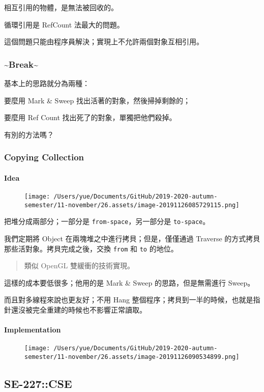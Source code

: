 \documentclass[
]{article}
\begin{document}
相互引用的物體，是無法被回收的。

循環引用是 RefCount 法最大的問題。

這個問題只能由程序員解決；實現上不允許兩個對象互相引用。

\hypertarget{header-n51}{%
\subsubsection{\texorpdfstring{\textasciitilde{}Break\textasciitilde{}}{\textasciitilde Break\textasciitilde{}}}\label{header-n51}}

基本上的思路就分為兩種：

要麼用 Mark \& Sweep 找出活著的對象，然後掃掉剩餘的；

要麼用 Ref Count 找出死了的對象，單獨把他們殺掉。

有別的方法嗎？

\hypertarget{header-n56}{%
\subsubsection{Copying Collection}\label{header-n56}}

\hypertarget{header-n57}{%
\paragraph{Idea}\label{header-n57}}

\begin{figure}
\centering
\texttt{[image: /Users/yue/Documents/GitHub/2019-2020-autumn-semester/11-november/26.assets/image-20191126085729115.png]}
\caption{}
\end{figure}

把堆分成兩部分；一部分是 \texttt{from-space}，另一部分是
\texttt{to-space}。

我們定期將 Object 在兩塊堆之中進行拷貝；但是，僅僅通過 Traverse
的方式拷貝那些活對象。拷貝完成之後，交換 \texttt{from} 和 \texttt{to}
的地位。

\begin{quote}
類似 OpenGL 雙緩衝的技術實現。
\end{quote}

這樣的成本要低很多；他用的是 Mark \& Sweep 的思路，但是無需進行 Sweep。

而且對多線程來說也更友好；不用 Hang
整個程序；拷貝到一半的時候，也就是指針還沒被完全重建的時候也不影響正常讀取。

\hypertarget{header-n65}{%
\paragraph{Implementation}\label{header-n65}}

\begin{figure}
\centering
\texttt{[image: /Users/yue/Documents/GitHub/2019-2020-autumn-semester/11-november/26.assets/image-20191126090534899.png]}
\caption{}
\end{figure}

\hypertarget{header-n67}{%
\subsection{SE-227::CSE}\label{header-n67}}
\end{document}
